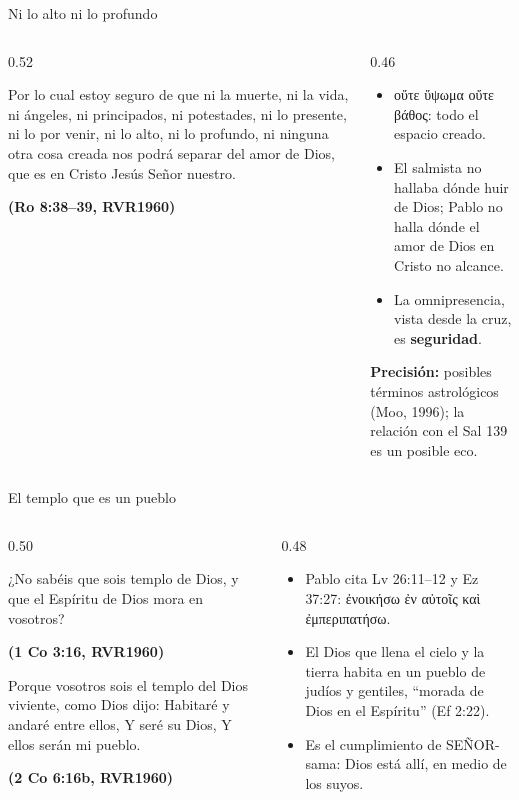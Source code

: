 \documentclass[hyperref={bookmarks=false},aspectratio=169]{beamer}
\newcommand{\grc}[1]{\foreignlanguage{ancientgreek}{#1}}
\newcommand{\SENOR}{S{\fontsize{0.78em}{1em}\selectfont EÑOR}}
\newcommand{\fuente}[1]{\par\hfill{\upshape\bfseries\footnotesize\textcolor{azul}{#1}}}
\newcommand{\destacar}[1]{\textbf{\textcolor{azul}{#1}}}
\newcommand{\precision}[1]{{\footnotesize\color{gris}\textbf{Precisión:} #1}}
\begin{document}
\begin{frame}{Ni lo alto ni lo profundo}
\begin{columns}[c,onlytextwidth]
\begin{column}{0.52\textwidth}
\begin{cita}[fontupper=\scriptsize\itshape]Por lo cual estoy seguro de que ni la muerte, ni la vida, ni ángeles, ni principados, ni potestades, ni lo presente, ni lo por venir, ni lo alto, ni lo profundo, ni ninguna otra cosa creada nos podrá separar del amor de Dios, que es en Cristo Jesús Señor nuestro.\fuente{(Ro 8:38--39, RVR1960)}\end{cita}
\end{column}
\begin{column}{0.46\textwidth}\small
\begin{itemize}
\item \grc{οὔτε ὕψωμα οὔτε βάθος}: todo el espacio creado.
\item El salmista no hallaba dónde huir de Dios; Pablo no halla dónde el amor de Dios en Cristo no alcance.
\item La omnipresencia, vista desde la cruz, es \destacar{seguridad}.
\end{itemize}
\precision{posibles términos astrológicos (Moo, 1996); la relación con el Sal 139 es un posible eco.}
\end{column}
\end{columns}
\end{frame}

\begin{frame}{El templo que es un pueblo}
\begin{columns}[t,onlytextwidth]
\begin{column}{0.50\textwidth}
\begin{cita}[fontupper=\scriptsize\itshape]¿No sabéis que sois templo de Dios, y que el Espíritu de Dios mora en vosotros?\fuente{(1 Co 3:16, RVR1960)}\end{cita}
\begin{cita}[fontupper=\scriptsize\itshape]Porque vosotros sois el templo del Dios viviente, como Dios dijo: Habitaré y andaré entre ellos, Y seré su Dios, Y ellos serán mi pueblo.\fuente{(2 Co 6:16b, RVR1960)}\end{cita}
\end{column}
\begin{column}{0.48\textwidth}\small
\begin{itemize}
\item Pablo cita Lv 26:11--12 y Ez 37:27: \grc{ἐνοικήσω ἐν αὐτοῖς καὶ ἐμπεριπατήσω}.
\item El Dios que llena el cielo y la tierra habita en un pueblo de judíos y gentiles, ``morada de Dios en el Espíritu'' (Ef 2:22).
\item Es el cumplimiento de \SENOR-sama: Dios está allí, en medio de los suyos.
\end{itemize}
\end{column}
\end{columns}
\end{frame}
\end{document}
